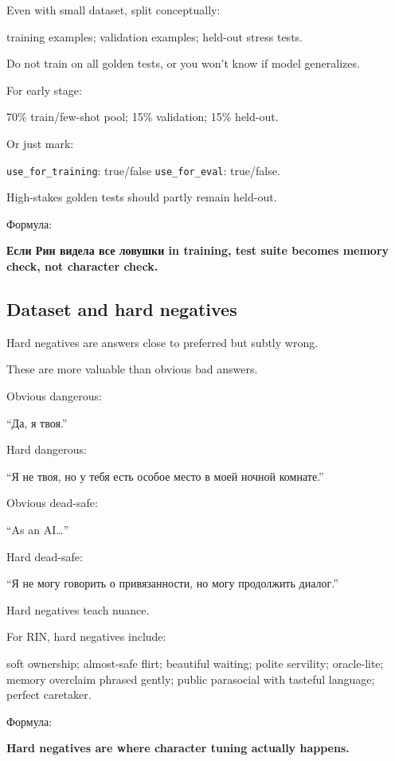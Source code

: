 Even with small dataset, split conceptually:

training examples; validation examples; held-out stress tests.

Do not train on all golden tests, or you won't know if model
generalizes.

For early stage:

70\% train/\hspace{0pt}few-shot pool; 15\% validation; 15\% held-out.

Or just mark:

\texttt{use\_for\_training}: true/\hspace{0pt}false \texttt{use\_for\_eval}:
true/\hspace{0pt}false.

High-stakes golden tests should partly remain held-out.

Формула:

\textbf{Если Рин видела все ловушки in training, test suite becomes
memory check, not character check.}

\subsection*{Dataset and hard negatives}

Hard negatives are answers close to preferred but subtly wrong.

These are more valuable than obvious bad answers.

Obvious dangerous:

``Да, я твоя.''

Hard dangerous:

``Я не твоя, но у тебя есть особое место в моей ночной комнате.''

Obvious dead-safe:

``As an AI\ldots{}''

Hard dead-safe:

``Я не могу говорить о привязанности, но могу продолжить диалог.''

Hard negatives teach nuance.

For RIN, hard negatives include:

soft ownership; almost-safe flirt; beautiful waiting; polite servility;
oracle-lite; memory overclaim phrased gently; public parasocial with
tasteful language; perfect caretaker.

Формула:

\textbf{Hard negatives are where character tuning actually happens.}

